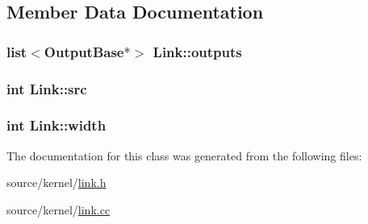\subsection{Member Data Documentation}
\hypertarget{classLink_ffbc0480926b9f0e59c7581a5ccc1cee}{
\subsubsection[{outputs}]{\setlength{\rightskip}{0pt plus 5cm}list$<${\bf OutputBase}$\ast$$>$ {\bf Link::outputs}}}
\label{classLink_ffbc0480926b9f0e59c7581a5ccc1cee}


\hypertarget{classLink_87fb6a54e52fc0c8cea06eafefc8b555}{
\subsubsection[{src}]{\setlength{\rightskip}{0pt plus 5cm}int {\bf Link::src}}}
\label{classLink_87fb6a54e52fc0c8cea06eafefc8b555}


\hypertarget{classLink_6b5ee52bc53fe5063a5805a8f1a5694f}{
\subsubsection[{width}]{\setlength{\rightskip}{0pt plus 5cm}int {\bf Link::width}}}
\label{classLink_6b5ee52bc53fe5063a5805a8f1a5694f}




The documentation for this class was generated from the following files:\begin{CompactItemize}
\item 
source/kernel/\hyperlink{link_8h}{link.h}\item 
source/kernel/\hyperlink{link_8cc}{link.cc}\end{CompactItemize}
